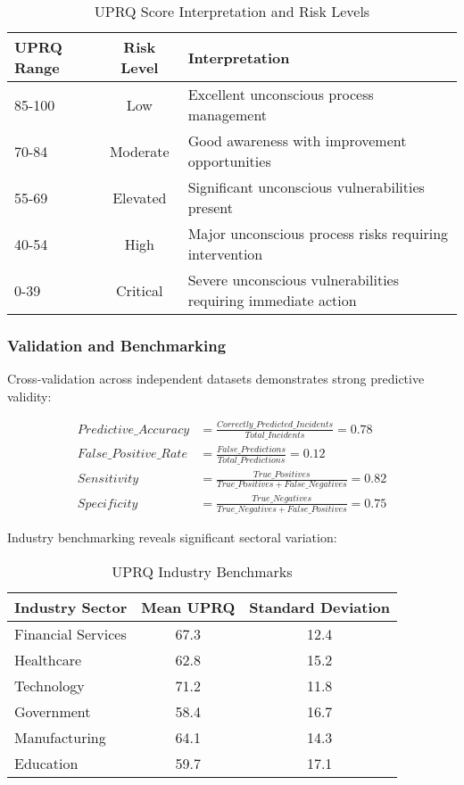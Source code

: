 \documentclass[11pt,a4paper]{article}
\begin{document}
\begin{table}[H]
\centering
\caption{UPRQ Score Interpretation and Risk Levels}
\begin{tabular}{lcl}
\toprule
UPRQ Range & Risk Level & Interpretation \\
\midrule
85-100 & Low & Excellent unconscious process management \\
70-84 & Moderate & Good awareness with improvement opportunities \\
55-69 & Elevated & Significant unconscious vulnerabilities present \\
40-54 & High & Major unconscious process risks requiring intervention \\
0-39 & Critical & Severe unconscious vulnerabilities requiring immediate action \\
\bottomrule
\end{tabular}
\end{table}

\subsubsection{Validation and Benchmarking}

Cross-validation across independent datasets demonstrates strong predictive validity:

\begin{align}
Predictive\_Accuracy &= \frac{Correctly\_Predicted\_Incidents}{Total\_Incidents} = 0.78 \\
False\_Positive\_Rate &= \frac{False\_Predictions}{Total\_Predictions} = 0.12 \\
Sensitivity &= \frac{True\_Positives}{True\_Positives + False\_Negatives} = 0.82 \\
Specificity &= \frac{True\_Negatives}{True\_Negatives + False\_Positives} = 0.75
\end{align}

Industry benchmarking reveals significant sectoral variation:

\begin{table}[H]
\centering
\caption{UPRQ Industry Benchmarks}
\begin{tabular}{lcc}
\toprule
Industry Sector & Mean UPRQ & Standard Deviation \\
\midrule
Financial Services & 67.3 & 12.4 \\
Healthcare & 62.8 & 15.2 \\
Technology & 71.2 & 11.8 \\
Government & 58.4 & 16.7 \\
Manufacturing & 64.1 & 14.3 \\
Education & 59.7 & 17.1 \\
\bottomrule
\end{tabular}
\end{table}
\end{document}
